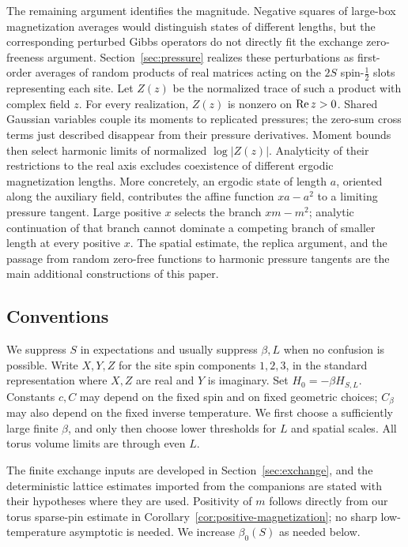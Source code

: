 The remaining argument identifies the magnitude. Negative squares of
large-box magnetization averages would distinguish states of different
lengths, but the corresponding perturbed Gibbs operators do not directly
fit the exchange zero-freeness argument. Section~\ref{sec:pressure}
realizes these perturbations as first-order averages of random products
of real matrices acting on the $2S$ spin-$\tfrac12$ slots representing
each site. Let $Z(z)$ be the normalized trace of such a product with
complex field $z$. For every realization, $Z(z)$ is nonzero on
$\operatorname{Re} z>0$. Shared Gaussian variables couple its moments to replicated
pressures; the zero-sum cross terms just described disappear from their
pressure derivatives. Moment bounds then select harmonic limits of
normalized $\log|Z(z)|$. Analyticity of their restrictions to
the real axis excludes coexistence of different ergodic magnetization
lengths. More concretely, an ergodic state of length $a$, oriented along
the auxiliary field, contributes the affine function $xa-a^2$ to a
limiting pressure tangent. Large positive $x$
selects the branch $xm-m^2$; analytic continuation of that branch cannot
dominate a competing branch of smaller length at every positive $x$.
The spatial estimate, the replica argument, and the passage from
random zero-free functions to harmonic pressure tangents are the main
additional constructions of this paper.

\subsection{Conventions}\label{subsec:conventions}
We suppress $S$ in expectations and usually suppress $\beta,L$ when no
confusion is possible. Write $X,Y,Z$ for the site spin components
$1,2,3$, in the standard representation where $X,Z$ are real and $Y$ is
imaginary. Set $H_0=-\beta H_{S,L}$. Constants $c,C$ may depend on the fixed
spin and on fixed geometric choices; $C_\beta$ may also depend on the
fixed inverse temperature. We first choose a sufficiently large finite
$\beta$, and only then choose lower thresholds for $L$ and spatial scales.
All torus volume limits are through even $L$.

The finite exchange inputs are developed in Section~\ref{sec:exchange},
and the deterministic lattice estimates imported from the companions
are stated with their hypotheses where they are used. Positivity of
$m$ follows directly from our torus sparse-pin estimate in
Corollary~\ref{cor:positive-magnetization}; no sharp low-temperature
asymptotic is needed. We increase $\beta_0(S)$ as needed below.
